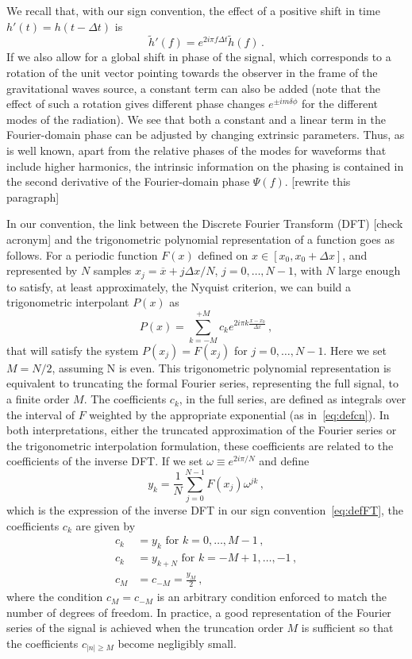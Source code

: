 \documentclass[aps,showpacs,twocolumn,
prd,superscriptaddress,nofootinbib]{revtex4-1}
\newcommand{\be}{\begin{equation}}
\newcommand{\ee}{\end{equation}}
\newcommand{\ov}[1]{\overline{#1}}
\newcommand{\nn}{\nonumber}
\newcommand{\SM}[1]{{\color{Red} #1}}
\begin{document}
We recall that, with our sign convention, the effect of a positive shift in time $h' (t) = h(t- \Delta t)$ is
\be
	\tilde{h}'(f) = e^{2i\pi f \Delta t} \tilde{h}(f) \,.
\ee
If we also allow for a global shift in phase of the signal, which corresponds to a rotation of the unit vector pointing towards the observer in the frame of the gravitational waves source, a constant term can also be added (note that the effect of such a rotation gives different phase changes $e^{\pm i m \delta \phi}$ for the different modes of the radiation). We see that both a constant and a linear term in the Fourier-domain phase can be adjusted by changing extrinsic parameters. Thus, as is well known, apart from the relative phases of the modes for waveforms that include higher harmonics, the intrinsic information on the phasing is contained in the second derivative of the Fourier-domain phase $\Psi(f)$. \SM{[rewrite this paragraph]}

In our convention, the link between the Discrete Fourier Transform (DFT) \SM{[check acronym]} and the trigonometric polynomial representation of a function goes as follows. For a periodic function $F(x)$ defined on $x\in [x_{0}, x_{0} + \Delta x]$, and represented by $N$ samples $x_{j} = \ov{x} + j \Delta x/N$, $j=0,\dots,N-1$, with $N$ large enough to satisfy, at least approximately, the Nyquist criterion, we can build a trigonometric interpolant $P(x)$ as
\be
	P(x) = \sum\limits_{k=-M}^{+M} c_{k} e^{2i\pi k \frac{x-x_{0}}{\Delta x}} \,,
\ee
that will satisfy the system $P(x_{j}) = F(x_{j})$ for $j=0,\dots, N-1$. Here we set $M=N/2$, assuming N is even. This trigonometric polynomial representation is equivalent to truncating the formal Fourier series, representing the full signal, to a finite order $M$. The coefficients $c_{k}$, in the full series, are defined as integrals over the interval of $F$ weighted by the appropriate exponential (as in~\eqref{eq:defcn}). In both interpretations, either the truncated approximation of the Fourier series or  the trigonometric interpolation formulation, these coefficients are related to the coefficients of the inverse DFT. If we set $\omega \equiv e^{2i\pi/N}$ and define
\be\label{eq:ykDFT}
	y_{k} = \frac{1}{N} \sum\limits_{j=0}^{N-1} F(x_{j}) \omega^{jk} \,,
\ee
which is the expression of the inverse DFT in our sign convention~\eqref{eq:defFT}, the coefficients $c_{k}$ are given by
\begin{align}\label{eq:ckyk}
	c_{k} &= y_{k} \text{ for } k=0,\dots, M-1 \,, \nn\\
	c_{k} &= y_{k+N} \text{ for } k=-M+1,\dots, -1 \,, \nn\\
	c_{M} &= c_{-M} = \frac{y_{M}}{2} \,,
\end{align}
where the condition $c_{M} = c_{-M}$ is an arbitrary condition enforced to match the number of degrees of freedom. In practice, a good representation of the Fourier series of the signal is achieved when the truncation order $M$ is sufficient so that the coefficients $c_{|n|\geq M}$ become negligibly small.
\end{document}
